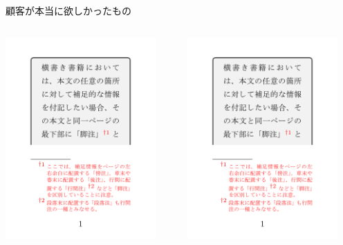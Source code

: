 \documentclass[unicode,14pt]{beamer}
\begin{document}
\begin{frame}[t]{顧客が本当に欲しかったもの}
\begin{columns}
\begin{column}{0.3\textwidth}
\colorbox{white}{\includegraphics[width=0.9\textwidth, page=2]{codes/history6.pdf}}
\end{column}
\begin{column}{0.3\textwidth}
\colorbox{white}{\includegraphics[width=0.9\textwidth, page=3]{codes/history6.pdf}}

\end{column}
\end{columns}
\end{frame}
\end{document}
